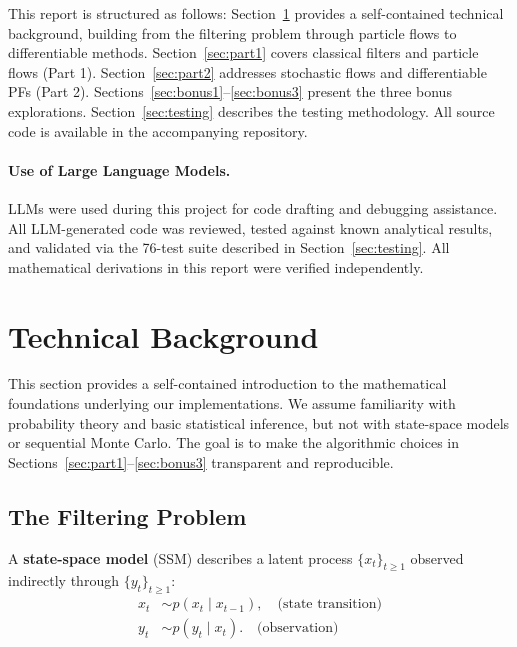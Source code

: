 \documentclass[12pt,a4paper]{article}
\theoremstyle{definition}
\theoremstyle{remark}
\begin{document}
This report is structured as follows: Section~\ref{sec:background} provides a self-contained technical background, building from the filtering problem through particle flows to differentiable methods. Section~\ref{sec:part1} covers classical filters and particle flows (Part 1). Section~\ref{sec:part2} addresses stochastic flows and differentiable PFs (Part 2). Sections~\ref{sec:bonus1}--\ref{sec:bonus3} present the three bonus explorations. Section~\ref{sec:testing} describes the testing methodology. All source code is available in the accompanying repository.

\paragraph{Use of Large Language Models.} LLMs were used during this project for code drafting and debugging assistance. All LLM-generated code was reviewed, tested against known analytical results, and validated via the 76-test suite described in Section~\ref{sec:testing}. All mathematical derivations in this report were verified independently.


\section{Technical Background}
\label{sec:background}

This section provides a self-contained introduction to the mathematical foundations underlying our implementations. We assume familiarity with probability theory and basic statistical inference, but not with state-space models or sequential Monte Carlo. The goal is to make the algorithmic choices in Sections~\ref{sec:part1}--\ref{sec:bonus3} transparent and reproducible.

\subsection{The Filtering Problem}

A \textbf{state-space model} (SSM) describes a latent process $\{x_t\}_{t \geq 1}$ observed indirectly through $\{y_t\}_{t \geq 1}$:
\begin{align}
	x_t &\sim p(x_t \mid x_{t-1}), \quad \text{(state transition)} \label{eq:transition} \\
	y_t &\sim p(y_t \mid x_t). \quad \text{(observation)} \label{eq:observation}
\end{align}
\end{document}
